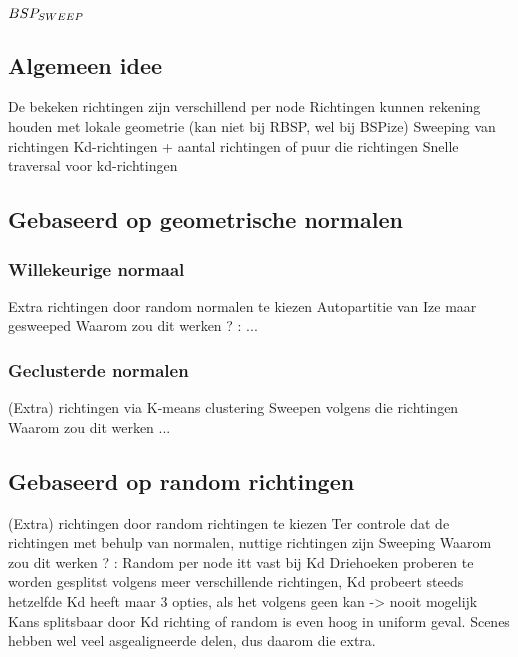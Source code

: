 \chapter{$BSP_{SWEEP}$}
\label{hoofdstuk:bsp-sweep}


\section{Algemeen idee}
    De bekeken richtingen zijn verschillend per node
    Richtingen kunnen rekening houden met lokale geometrie (kan niet bij RBSP, wel bij BSPize)
    Sweeping van richtingen
    Kd-richtingen + aantal richtingen of puur die richtingen
    Snelle traversal voor kd-richtingen
\section{Gebaseerd op geometrische normalen}
\subsection{Willekeurige normaal}
    Extra richtingen door random normalen te kiezen
    Autopartitie van Ize maar gesweeped
    Waarom zou dit werken ? : ...
    
\subsection{Geclusterde normalen}
    (Extra) richtingen via K-means clustering
    Sweepen volgens die richtingen
    Waarom zou dit werken ...
\section{Gebaseerd op random richtingen}
    (Extra) richtingen door random richtingen te kiezen
    Ter controle dat de richtingen met behulp van normalen, nuttige richtingen zijn
    Sweeping
    Waarom zou dit werken ? : Random per node itt vast bij Kd
        Driehoeken proberen te worden gesplitst volgens meer verschillende richtingen, Kd probeert steeds hetzelfde
        Kd heeft maar 3 opties, als het volgens geen kan -> nooit mogelijk
        Kans splitsbaar door Kd richting of random is even hoog in uniform geval. Scenes hebben wel veel asgealigneerde delen, dus daarom die extra.


